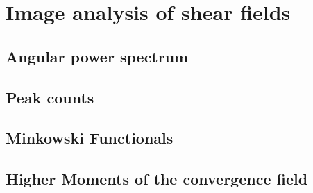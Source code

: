 
\chapter{Image analysis of shear fields}
\lhead[\fancyplain{}{\thepage}]{\fancyplain{}{\rightmark}}
 \thispagestyle{plain}
\setlength{\parindent}{10mm}


\section{Angular power spectrum}

\section{Peak counts}

\section{Minkowski Functionals}

\section{Higher Moments of the convergence field}

%